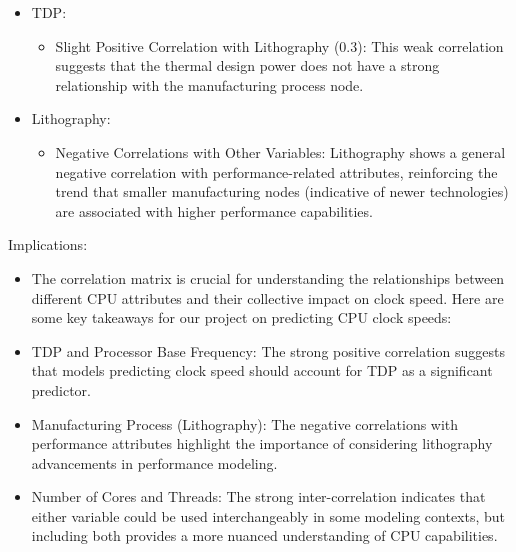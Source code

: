 \begin{itemize}
    \item TDP:
    \begin{itemize}
        \item Slight Positive Correlation with Lithography (0.3): This weak correlation suggests that the thermal design power does not have a strong relationship with the manufacturing process node.
    \end{itemize}
    
    \item Lithography:
    \begin{itemize}
        \item Negative Correlations with Other Variables: Lithography shows a general negative correlation with performance-related attributes, reinforcing the trend that smaller manufacturing nodes (indicative of newer technologies) are associated with higher performance capabilities.
    \end{itemize}
\end{itemize}

Implications:
\begin{itemize}
    \item The correlation matrix is crucial for understanding the relationships between different CPU attributes and their collective impact on clock speed. Here are some key takeaways for our project on predicting CPU clock speeds:
    
    \item TDP and Processor Base Frequency: The strong positive correlation suggests that models predicting clock speed should account for TDP as a significant predictor.
    
    \item Manufacturing Process (Lithography): The negative correlations with performance attributes highlight the importance of considering lithography advancements in performance modeling.
    
    \item Number of Cores and Threads: The strong inter-correlation indicates that either variable could be used interchangeably in some modeling contexts, but including both provides a more nuanced understanding of CPU capabilities.
\end{itemize}


\newpage

